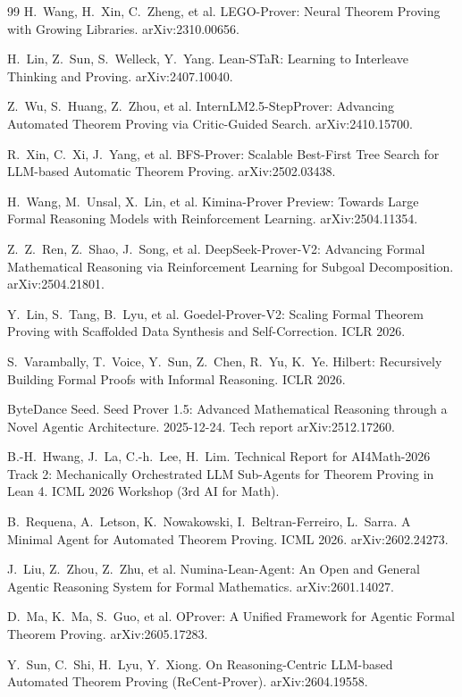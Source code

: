 \documentclass[UTF8,a4paper,11pt,fontset=windows]{ctexart}
\begin{document}
\begin{thebibliography}{99}
 H.~Wang, H.~Xin, C.~Zheng, et al. LEGO-Prover: Neural Theorem Proving with Growing Libraries. arXiv:2310.00656.

 H.~Lin, Z.~Sun, S.~Welleck, Y.~Yang. Lean-STaR: Learning to Interleave Thinking and Proving. arXiv:2407.10040.

 Z.~Wu, S.~Huang, Z.~Zhou, et al. InternLM2.5-StepProver: Advancing Automated Theorem Proving via Critic-Guided Search. arXiv:2410.15700.

 R.~Xin, C.~Xi, J.~Yang, et al. BFS-Prover: Scalable Best-First Tree Search for LLM-based Automatic Theorem Proving. arXiv:2502.03438.

 H.~Wang, M.~Unsal, X.~Lin, et al. Kimina-Prover Preview: Towards Large Formal Reasoning Models with Reinforcement Learning. arXiv:2504.11354.

 Z.~Z.~Ren, Z.~Shao, J.~Song, et al. DeepSeek-Prover-V2: Advancing Formal Mathematical Reasoning via Reinforcement Learning for Subgoal Decomposition. arXiv:2504.21801.

 Y.~Lin, S.~Tang, B.~Lyu, et al. Goedel-Prover-V2: Scaling Formal Theorem Proving with Scaffolded Data Synthesis and Self-Correction. ICLR 2026.

 S.~Varambally, T.~Voice, Y.~Sun, Z.~Chen, R.~Yu, K.~Ye. Hilbert: Recursively Building Formal Proofs with Informal Reasoning. ICLR 2026.

 ByteDance Seed. Seed Prover 1.5: Advanced Mathematical Reasoning through a Novel Agentic Architecture. 2025-12-24. Tech report arXiv:2512.17260.

 B.-H.~Hwang, J.~La, C.-h.~Lee, H.~Lim. Technical Report for AI4Math-2026 Track 2: Mechanically Orchestrated LLM Sub-Agents for Theorem Proving in Lean 4. ICML 2026 Workshop (3rd AI for Math).

 B.~Requena, A.~Letson, K.~Nowakowski, I.~Beltran-Ferreiro, L.~Sarra. A Minimal Agent for Automated Theorem Proving. ICML 2026. arXiv:2602.24273.

 J.~Liu, Z.~Zhou, Z.~Zhu, et al. Numina-Lean-Agent: An Open and General Agentic Reasoning System for Formal Mathematics. arXiv:2601.14027.

 D.~Ma, K.~Ma, S.~Guo, et al. OProver: A Unified Framework for Agentic Formal Theorem Proving. arXiv:2605.17283.

 Y.~Sun, C.~Shi, H.~Lyu, Y.~Xiong. On Reasoning-Centric LLM-based Automated Theorem Proving (ReCent-Prover). arXiv:2604.19558.


\end{thebibliography}
\end{document}
